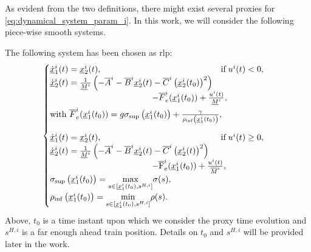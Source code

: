 As evident from the two definitions, there might exist several proxies for  \eqref{eq:dynamical_system_param_i}. In this work, we will consider the following piece-wise smooth systems.


The following system has been chosen as \gls{rlp}:
\begin{equation}\label{eq:rlp_train}
	\begin{cases}
		\underline{\dot{x}}_1^i(t) =   \underline{x}_2^i(t), \qquad  \qquad \qquad \qquad \qquad \qquad  \qquad  \text{if} \; u^i(t) < 0,  \\
		\underline{\dot{x}}_2^i(t) =  \frac{1}{\underline{M}^i} \left(-\overline{A}^i - \overline{B}^i \underline{x}^i_2(t) -  \overline{C}^i \left(\underline{x}^i_2(t_0)\right)^2 \right) \\ 
		\qquad \qquad \qquad  \qquad \qquad \qquad  -\overline{F}_e^i(\underline{x}^i_1(t_0)) + \frac{u^i(t)}{\underline{M}^i}, \\ \noalign{\vskip3pt}
		\textrm{with } \overline{F}_e^i(\underline{x}^i_1(t_0)) =  g \sigma_{\sup}\left(\underline{x}^i_1(t_0)\right)+ \frac{\gamma}{\rho_{\inf}\left(\underline{x}^i_1(t_0)\right)}, \\
		\noalign{\vskip9pt}
		\underline{\dot{x}}_1^i(t) =   \underline{x}_2^i(t), \qquad \qquad \qquad  \qquad \qquad \qquad \qquad \text{if} \; u^i(t) \geq 0,  \\
		\underline{\dot{x}}_2^i(t) =  \frac{1}{\underline{M}^i} \left(-\overline{A}^i - \overline{B}^i \underline{x}^i_2(t) -  \overline{C}^i \left(\underline{x}^i_2(t)\right)^2 \right) \\ 
		\qquad \qquad \qquad  \qquad \qquad \qquad-\overline{\mathrm{F}}_e^i(\underline{x}^i_1(t_0))  + \frac{u^i(t)}{\overline{M}^i}, \\
		\sigma_{\sup}\left(\underline{x}^i_1(t_0)\right) = \underset{s \in [\underline{x}_1^i(t_0),s^{H,i}]}{\max} \sigma(s), \\
		\rho_{\inf}\left(\underline{x}^i_1(t_0)\right) = \underset{s \in [\underline{x}_1^i(t_0),s^{H,i}]}{\min} \rho(s).
	\end{cases}
\end{equation}
Above, $t_0$ is a time instant upon which we consider the proxy time evolution and $s^{H,i}$ is a far enough ahead train  position. Details on $t_0$ and $s^{H,i}$ will be provided later in the work. 


